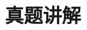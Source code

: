 \chapter{真题讲解}
\label{chap23}

\begin{comment}


\begin{itemize}[noitemsep,topsep=0pt,parsep=0pt,partopsep=0pt]
	\item 2019数据结构和组成原理真题(150分)
	\item 2019数据结构和组成原理真题答案
\end{itemize}


\section{杭州电子科技大学2019年攻读硕士学位研究生招生考试《数据结构与组成原理》试题}
(试题共9大题，共10页，总分150分)\newline
姓名\_\_\_\_ 报考专业\_\_\_\_ 准考证号\_\_\_\_\newline
【所有答案必须卸载答题纸上，做在试卷或草稿纸上无效！】\newline

\end{comment}

